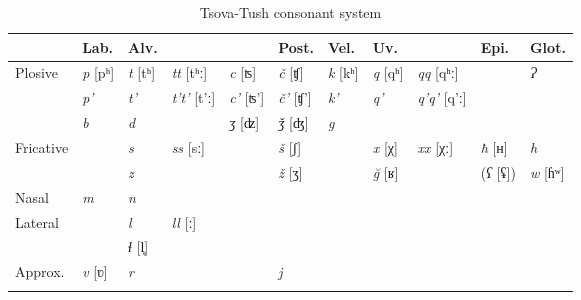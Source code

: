\begin{sidewaystable}
	\begin{tabular}{lllllllllll}
    \lsptoprule
		&  {Lab.}  & {Alv.}& & & {Post.}& {Vel.}& {Uv.} & & {Epi.}& {Glot.} \\
		\midrule
		Plosive & \textit{p} [pʰ] & \textit{t} [tʰ]&  \textit{tt} [tʰː] & \textit{c} [ʦ] & \textit{č} [ʧ] & \textit{k} [kʰ]& \textit{q} [qʰ]& \textit{qq} [qʰː] & & \textit{Ɂ} \\
		
		
		&   \textit{p'} & \textit{t'} & \textit{t't'} [t'ː]& \textit{c'} [ʦ'] & \textit{č'} [ʧ'] & \textit{k'} & \textit{q'} & \textit{q'q'} [q'ː] & &  \\
		
		
		&   \textit{b}  & \textit{d} & 
		& \textit{ʒ} [ʣ] & \textit{ǯ} [ʤ] & \textit{g} & &  & & \\
		
		
		Fricative    & & \textit{s} & \textit{ss} [sː] & & \textit{š} [ʃ]&  & \textit{x} [χ]& \textit{xx} [χː] & \textit{ħ} [ʜ] & \textit{h} \\
		
		&   & \textit{z} & & & \textit{ž} [ʒ]&  & \textit{\u{g}} [ʁ]&  & (\textit{ʕ} [ʢ])& \textit{w} [ɦʷ] \\
		
		Nasal  & \textit{m} & \textit{n} &  & &  &  &  & & & \\
		
		Lateral  &  & \textit{l} & \textit{ll} [ː]  & &  &  &  & & & \\
		&    & \textit{ɬ} [l̥]& & & & &  &  & &  \\
		
		Approx.   & \textit{v} [ʋ]& \textit{r} &  & &  \textit{j}  &  &  &  & \\
		\lspbottomrule
	\end{tabular}
	\caption{Tsova-Tush consonant system}
	\label{phon-table1}
\end{sidewaystable}


